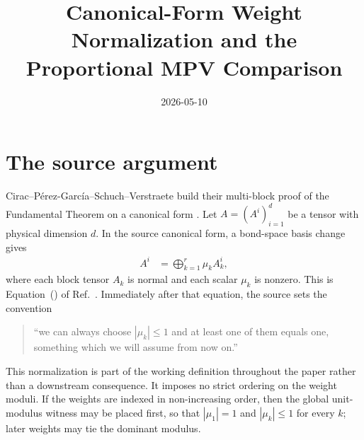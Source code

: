 \documentclass{article}
\title{Canonical-Form Weight Normalization and the Proportional MPV Comparison}
\author{}
\date{2026-05-10}
\begin{document}
\maketitle
{}

\section{The source argument}

Cirac--P\'erez-Garc\'ia--Schuch--Verstraete build their multi-block proof of
the Fundamental Theorem on a canonical form
\cite[Section~]{Cirac2016MPDO_arXiv}. Let $A=(A^i)_{i=1}^d$ be
a tensor with physical dimension $d$. In the source canonical form, a
bond-space basis change gives
\begin{align}
    A^i
        &= \bigoplus_{k=1}^r \mu_k A_k^i,
    \label{eq:cpsv16_cf_normalization_and_proportional_comparison_source_canonical_form}
\end{align}
where each block tensor $A_k$ is normal and each scalar $\mu_k$ is nonzero.
This is Equation~() of Ref.~\cite{Cirac2016MPDO_arXiv}.
Immediately after that equation, the source sets the convention
\begin{quote}
    ``we can always choose $|\mu_k|\leq 1$ and at least one of them equals one,
    something which we will assume from now on.''
    \cite[paragraph after Eq.~()]{Cirac2016MPDO_arXiv}
\end{quote}
This normalization is part of the working definition throughout the paper
rather than a downstream consequence. It imposes no strict ordering on the
weight moduli. If the weights are indexed in non-increasing order, then the
global unit-modulus witness may be placed first, so that $|\mu_1|=1$ and
$|\mu_k|\leq 1$ for every $k$; later weights may tie the dominant modulus.
\end{document}
